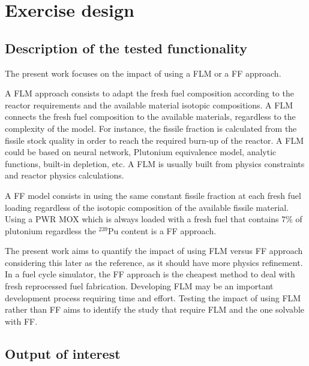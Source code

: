 \section{Exercise design}

\subsection{Description of the tested functionality}

The present work focuses on the impact of using a \gls{FLM} or a \gls{FF}
approach. 

A \gls{FLM} approach consists to adapt the fresh fuel composition according to
the reactor requirements and the available material isotopic compositions. A
\gls{FLM} connects the fresh fuel composition to the available materials,
regardless to the complexity of the model. For instance, the fissile fraction is
calculated from the fissile stock quality in order to reach the required burn-up
of the reactor. A \gls{FLM} could be based on neural network, Plutonium
equivalence model, analytic functions, built-in depletion, etc. A \gls{FLM} is
usually built from physics constraints and reactor physics calculations. 

A \gls{FF} model consists in using the same constant fissile fraction at each
fresh fuel loading regardless of the isotopic composition of the available
fissile material. Using a \gls{PWR} \gls{MOX} which is always loaded with a
fresh fuel that contains 7\% of plutonium regardless the $^{239}$Pu content is a
\gls{FF} approach. 

The present work aims to quantify the impact of using \gls{FLM} versus \gls{FF}
approach considering this later as the reference, as it should have more physics
refinement. In a fuel cycle simulator, the \gls{FF} approach is the cheapest
method to deal with fresh reprocessed fuel fabrication. Developing \gls{FLM}
may be an important development process requiring time and effort.
Testing the impact of using \gls{FLM} rather than \gls{FF} aims to identify the
study that require \gls{FLM} and the one solvable with \gls{FF}.

\subsection{Output of interest}

